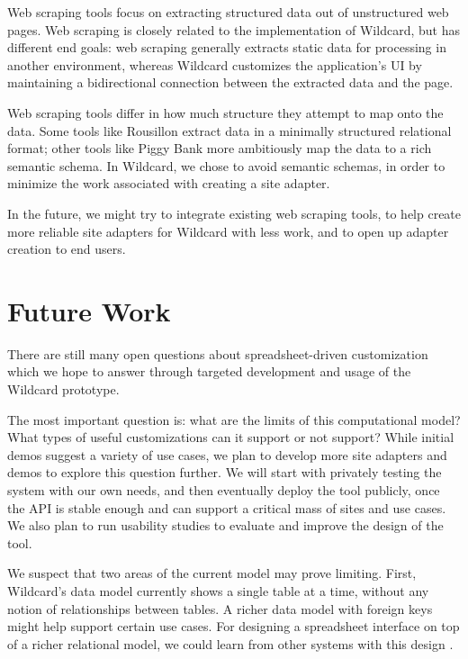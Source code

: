 \documentclass[english,submission]{programming}
\begin{document}
Web scraping tools focus on extracting structured data out of
unstructured web pages. Web scraping is closely related to the
implementation of Wildcard, but has different end goals: web scraping
generally extracts static data for processing in another environment,
whereas Wildcard customizes the application's UI by maintaining a
bidirectional connection between the extracted data and the page.

Web scraping tools differ in how much structure they attempt to map onto
the data. Some tools like Rousillon \autocite{chasins2018} extract data
in a minimally structured relational format; other tools like Piggy Bank
\autocite{huynh2005} more ambitiously map the data to a rich semantic
schema. In Wildcard, we chose to avoid semantic schemas, in order to
minimize the work associated with creating a site adapter.

In the future, we might try to integrate existing web scraping tools, to
help create more reliable site adapters for Wildcard with less work, and
to open up adapter creation to end users.

\hypertarget{future-work}{%
\section{Future Work}\label{future-work}}

There are still many open questions about spreadsheet-driven
customization which we hope to answer through targeted development and
usage of the Wildcard prototype.

The most important question is: what are the limits of this
computational model? What types of useful customizations can it support
or not support? While initial demos suggest a variety of use cases, we
plan to develop more site adapters and demos to explore this question
further. We will start with privately testing the system with our own
needs, and then eventually deploy the tool publicly, once the API is
stable enough and can support a critical mass of sites and use cases. We
also plan to run usability studies to evaluate and improve the design of
the tool.

We suspect that two areas of the current model may prove limiting.
First, Wildcard's data model currently shows a single table at a time,
without any notion of relationships between tables. A richer data model
with foreign keys might help support certain use cases. For designing a
spreadsheet interface on top of a richer relational model, we could
learn from other systems with this design
\autocite{mccutchen2016,bakke2016}.
\end{document}
